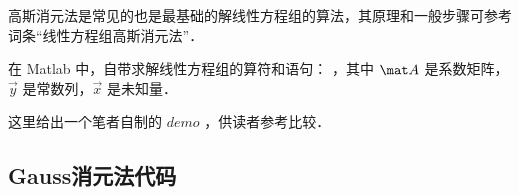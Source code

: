 

高斯消元法是常见的也是最基础的解线性方程组的算法，其原理和一般步骤可参考词条“线性方程组高斯消元法”．

在 Matlab 中，自带求解线性方程组的算符和语句： ，其中 $\mat A$ 是系数矩阵，$\vec y$ 是常数列，$\vec x$ 是未知量．

这里给出一个笔者自制的 $demo$ ，供读者参考比较．

\subsection{Gauss消元法代码}


